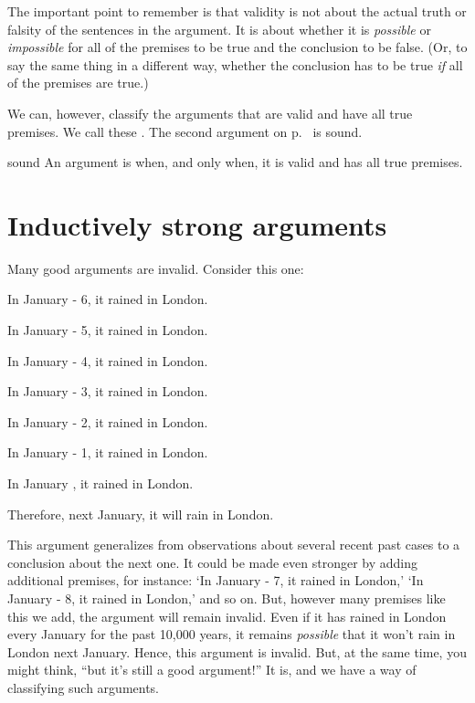 The important point to remember is that validity is not about the actual truth or falsity of the sentences in the argument. It is about whether it is \emph{possible} or \emph{impossible} for all of the premises to be true and the conclusion to be false. (Or, to say the same thing in a different way, whether the conclusion has to be true \textit{if} all of the premises are true.)

We can, however, classify the arguments that are valid and have all true premises. We call these \label{def-sound-arg}. The second argument on p.~\pageref{valid-bananas} is sound.

\begin{factboxy}{sound}
An argument is  when, and only when, it is valid and has all true premises.
\end{factboxy}


\section{Inductively strong arguments}
Many good arguments are invalid. Consider this one:
	\begin{earg}
		\item[1.] In January \the\numexpr \year - 6, it rained in London.
		\item[2.] In January \the\numexpr \year - 5, it rained in London.
		\item[3.] In January \the\numexpr \year - 4, it rained in London.
		\item[4.] In January \the\numexpr \year - 3, it rained in London.
		\item[5.] In January \the\numexpr \year - 2, it rained in London.
		\item[6.] In January \the\numexpr \year - 1, it rained in London.
		\item[7.] In January \the\year{}, it rained in London.
	\item[8.] Therefore, next January, it will rain in London.
\end{earg}

This argument generalizes from observations about several recent past cases to a conclusion about the next one. It could be made even stronger by adding additional premises, for instance: `In January \the\numexpr \year - 7, it rained in London,' `In January \the\numexpr \year - 8, it rained in London,' and so on. But, however many premises like this we add, the argument will remain invalid. Even if it has rained in London every January for the past 10,000 years, it remains \emph{possible} that it won't rain in London next January. Hence, this argument is invalid. But, at the same time, you might think, ``but it's still a good argument!'' It is, and we have a way of classifying such arguments.

